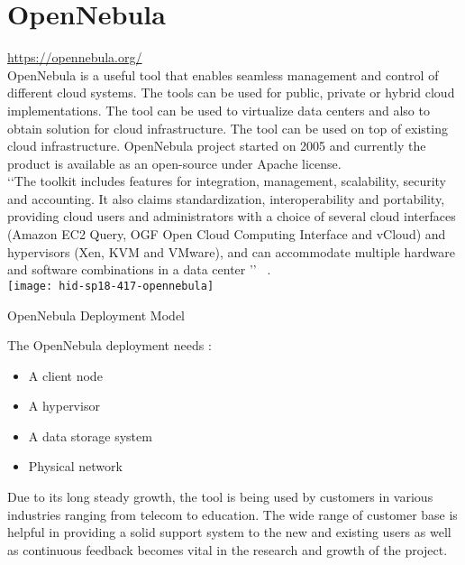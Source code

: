 
\graphicspath{ {images/} }
\section{OpenNebula}
\url{https://opennebula.org/} \\ 
   
OpenNebula is a useful tool that enables seamless management and control of different cloud systems.
The tools can be used for public, private or hybrid cloud implementations.
The tool can be used to virtualize data centers and also to obtain solution for cloud infrastructure.
The tool can be used on top of existing cloud infrastructure.
OpenNebula project started on 2005 and currently the product is available as an open-source under Apache license. \\
‘‘The toolkit includes features for integration, management, scalability, security and accounting.
It also claims standardization, interoperability and portability, providing cloud users and administrators with a choice of several
cloud interfaces (Amazon EC2 Query, OGF Open Cloud Computing Interface and vCloud) and hypervisors
(Xen, KVM and VMware), and can accommodate multiple hardware and software combinations in a data center ’’
~\cite{hid-sp18-417-opennebula-wiki}.\\

\texttt{[image: hid-sp18-417-opennebula]}
\begin{center}
OpenNebula Deployment Model ~\cite{hid-sp18-417-opennebula-deployment} 
\end{center}

The OpenNebula deployment needs :
\begin{itemize}
\item        A client node
\item        A hypervisor
\item        A data storage system
\item        Physical network
\end{itemize}

Due to its long steady growth, the tool is being used by customers in various industries ranging from telecom to education.
The wide range of customer base is helpful in providing a solid support system to the new and existing users as well as continuous
feedback becomes vital in the research and growth of the project. 

